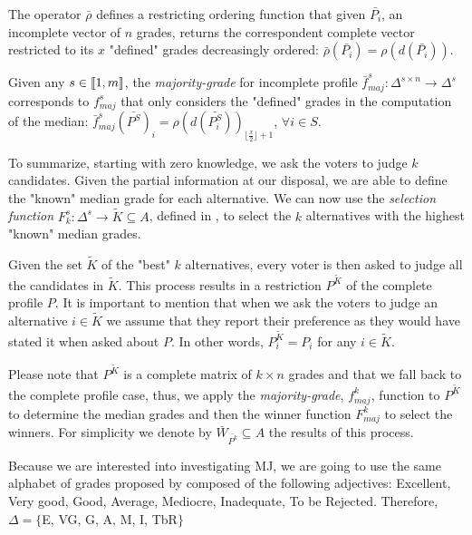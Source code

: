 \documentclass[version=3.21, pagesize, twoside=off, bibliography=totoc, DIV=calc, fontsize=12pt, a4paper]{scrartcl}
\begin{document}
The operator $\bar{\rho}$ defines a restricting ordering function that given $\bar{P_i}$, an incomplete vector of $n$ grades, returns the correspondent complete vector restricted to its $x$ "defined" grades decreasingly ordered: $\bar{\rho}(\bar{P_i})=\rho(d(\bar{P_i}))$. 

Given any $s \in \llbracket1,m\rrbracket$, the \emph{majority-grade} for incomplete profile $\bar{f}^s_{maj}: \Delta^{s \times n} \rightarrow \Delta^s$ corresponds to $f^s_{maj}$ that only considers the "defined" grades in the computation of the median: $\bar{f}^s_{maj}(\bar{P^S})_i = \rho(d(\bar{P^S_i}))_{\lfloor \frac{x}{2} \rfloor + 1}$, $\forall i \in S$.  

To summarize, starting with zero knowledge, we ask the voters to judge $k$ candidates. Given the partial information at our disposal, we are able to define the "known" median grade for each alternative. We can now use the \emph{selection function} $F^s_k:\Delta^s \rightarrow \tilde{K} \subseteq A$, defined in , to select the $k$ alternatives with the highest "known" median grades.

Given the set $\tilde{K}$ of the "best" $k$ alternatives, every voter is then asked to judge all the candidates in $\tilde{K}$. This process results in a restriction $P^{\tilde{K}}$ of the complete profile $P$. It is important to mention that when we ask the voters to judge an alternative $i\in \tilde{K}$ we assume that they report their preference as they would have stated it when asked about $P$. In other words, $P^{\tilde{K}}_{i} = P_i$ for any $i \in \tilde{K}$.

Please note that $P^{\tilde{K}}$ is a complete matrix of $k \times n$ grades and that we fall back to the complete profile case, thus, we apply the \emph{majority-grade}, $f^k_{maj}$, function to $P^{\tilde{K}}$ to determine the median grades and then the winner function $F^k_{maj}$ to select the winners. For simplicity we denote by $\bar{W}_{\bar{P^k}} \subseteq A$ the results of this process.

\begin{remark}
	Because we are interested into investigating \acs{MJ}, we are going to use the same alphabet of grades proposed by \citet{Balinski2011} composed of the following adjectives: Excellent, Very good, Good, Average, Mediocre, Inadequate, To be Rejected. Therefore, $\Delta=\{$E, VG, G, A, M, I, TbR$\}$ 
\end{remark}
\end{document}
